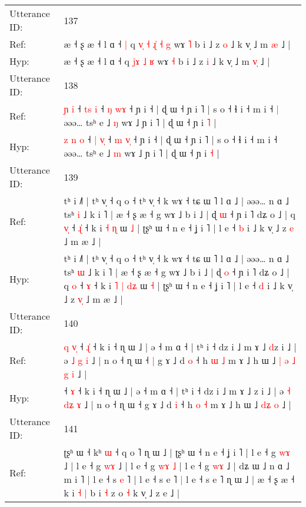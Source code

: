 \documentclass[10pt]{article}
\DeclareRobustCommand{\hl}[1]{{\textcolor{red}{#1}}}
\begin{document}
\begin{longtable}{ll}
 \\
\midrule
Utterance ID: & 137 \\
Ref: & æ ˧ ʂ æ ˧ l ɑ ˧\hl{ }\hl{|} q\hl{ }\hl{v}\hl{̩}\hl{ }\hl{˧} \hl{ɻ}\hl{̍} \hl{˧} \hl{g} wɤ \hl{˥} b i ˩ z \hl{o} ˩ k v̩ ˩ m \hl{}\hl{æ} ˩ |
 \\
Hyp: & æ ˧ ʂ æ ˧ l ɑ ˧\hl{}\hl{} q\hl{}\hl{}\hl{}\hl{}\hl{} \hl{j}\hl{ɤ} \hl{˩} \hl{ʁ} wɤ \hl{˧} b i ˩ z \hl{i} ˩ k v̩ ˩ m \hl{v}\hl{̩} ˩ |
 \\
\midrule
Utterance ID: & 138 \\
Ref: & \hl{}\hl{}\hl{ɲ} \hl{i} ˧ \hl{t}\hl{s}\hl{ }\hl{i} ˧ \hl{ŋ} \hl{w}\hl{ɤ} ˧ ɲ i ˧ | ɖ ɯ ˧ ɲ i ˥ | s o ˧ ɬ i ˧ m i ˧\hl{ }\hl{|} əəə… tsʰ e ˩ \hl{ŋ} wɤ ˩ ɲ i ˥ | ɖ ɯ ˧ ɲ i \hl{˥} |
 \\
Hyp: & \hl{z}\hl{ }\hl{n} \hl{o} ˧ \hl{|}\hl{ }\hl{v}\hl{̩} ˧ \hl{m} \hl{v}\hl{̩} ˧ ɲ i ˧ | ɖ ɯ ˧ ɲ i ˥ | s o ˧ ɬ i ˧ m i ˧\hl{}\hl{} əəə… tsʰ e ˩ \hl{m} wɤ ˩ ɲ i ˥ | ɖ ɯ ˧ ɲ i \hl{˧} |
 \\
\midrule
Utterance ID: & 139 \\
Ref: & tʰ i ˩˥ | tʰ v̩ ˧ q o ˧ tʰ v̩ ˧ k wɤ ˧ tɕ ɯ ˥ l ɑ ˩ | əəə… n ɑ ˩ tsʰ \hl{i} ˩ k i ˥ | æ ˧ ʂ æ ˧ g wɤ ˩ b i ˩ | ɖ \hl{ɯ} ˧ ɲ i ˥ dʑ o ˩ | q \hl{v}\hl{̩} ˧ \hl{ɻ}\hl{̍} ˧ k i\hl{}\hl{} \hl{˧} \hl{}\hl{ɳ} ɯ \hl{˩} | ʈʂʰ ɯ ˧ n e ˧ ʝ i ˥ | l e ˧ \hl{b} i ˩ k v̩ ˩ z \hl{}\hl{e} ˩ m æ ˩ |
 \\
Hyp: & tʰ i ˩˥ | tʰ v̩ ˧ q o ˧ tʰ v̩ ˧ k wɤ ˧ tɕ ɯ ˥ l ɑ ˩ | əəə… n ɑ ˩ tsʰ \hl{ɯ} ˩ k i ˥ | æ ˧ ʂ æ ˧ g wɤ ˩ b i ˩ | ɖ \hl{o} ˧ ɲ i ˥ dʑ o ˩ | q \hl{}\hl{o} ˧ \hl{}\hl{ɤ} ˧ k i\hl{ }\hl{˥} \hl{|} \hl{d}\hl{ʑ} ɯ \hl{˧} | ʈʂʰ ɯ ˧ n e ˧ ʝ i ˥ | l e ˧ \hl{d} i ˩ k v̩ ˩ z \hl{v}\hl{̩} ˩ m æ ˩ |
 \\
\midrule
Utterance ID: & 140 \\
Ref: & \hl{q}\hl{ }\hl{v}\hl{̩}\hl{ }˧ \hl{ɻ}\hl{̍} ˧ k i ˧ ɳ ɯ ˩ | ə ˧ m ɑ ˧ | tʰ i ˧ dz i ˩ m ɤ ˩ \hl{d}z i ˩ | ə \hl{˩} \hl{}\hl{g} \hl{i} ˩ | n o ˧ ɳ ɯ ˧\hl{ }\hl{|} g ɤ ˩ d \hl{o} ˧ h \hl{ɯ} \hl{˩} m ɤ ˩ h ɯ ˩\hl{ }\hl{|}\hl{ }\hl{ə} \hl{˩}\hl{ }\hl{g} \hl{i} ˩ |
 \\
Hyp: & \hl{}\hl{}\hl{}\hl{}\hl{}˧ \hl{}\hl{ɤ} ˧ k i ˧ ɳ ɯ ˩ | ə ˧ m ɑ ˧ | tʰ i ˧ dz i ˩ m ɤ ˩ \hl{}z i ˩ | ə \hl{˧} \hl{d}\hl{ʑ} \hl{ɤ} ˩ | n o ˧ ɳ ɯ ˧\hl{}\hl{} g ɤ ˩ d \hl{i} ˧ h \hl{o} \hl{˧} m ɤ ˩ h ɯ ˩\hl{}\hl{}\hl{}\hl{} \hl{}\hl{d}\hl{ʑ} \hl{o} ˩ |
 \\
\midrule
Utterance ID: & 141 \\
Ref: & ʈʂʰ ɯ ˧ kʰ \hl{ɯ} ˧ q o ˥ ɳ ɯ ˩ | ʈʂʰ ɯ ˧ n e ˧ ʝ i ˥ | l e ˧ g \hl{w}\hl{ɤ} ˩ | l e ˧ g \hl{w}\hl{ɤ} ˩ | l e ˧ g \hl{w}\hl{ɤ} \hl{}\hl{˩} | l e ˧ g \hl{w}\hl{ɤ} ˩ | dʑ ɯ ˩ n ɑ ˩ m i \hl{}˥ | l e ˧ s \hl{e} ˥ | l e ˧ s e ˥\hl{ }\hl{|} l e ˧ s e ˥ ɳ ɯ ˩ | æ ˧ ʂ æ ˧ k i\hl{ }\hl{˧} \hl{|} b i \hl{˧} z o \hl{˧} k v̩ ˩ z e ˩ |

\end{longtable}
\end{document}
